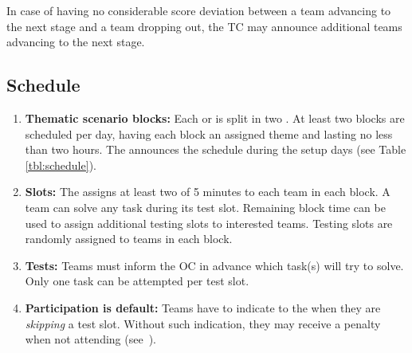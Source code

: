 In case of having no considerable score deviation between a team advancing to the next stage and a team dropping out, the TC may announce additional teams advancing to the next stage.


\subsection{Schedule}
\label{rule:schedule}

\begin{enumerate}
	\item \textbf{Thematic scenario blocks:} Each  or  is split in two .
	At least two blocks are scheduled per day, having each block an assigned theme and lasting no less than two hours.
	The  announces the schedule during the setup days (see Table \ref{tbl:schedule}).

	\item \textbf{Slots:} The  assigns at least two  of 5 minutes to each team in each block.
	A team can solve any task during its test slot.
	Remaining block time can be used to assign additional testing slots to interested teams.
	Testing slots are randomly assigned to teams in each block.

	\item \textbf{Tests:} Teams must inform the OC in advance which task(s) will try to solve.
	Only one task can be attempted per test slot.

	\item \textbf{Participation is default:} Teams have to indicate to the  when they are \emph{skipping} a test slot. Without such indication, they may receive a penalty when not attending (see~).
\end{enumerate}

